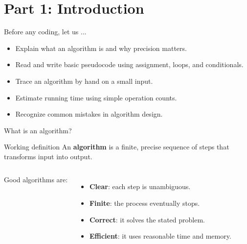 \documentclass[aspectratio=43,10pt]{beamer}
\begin{document}
\section{Part 1: Introduction}

\begin{frame}{Before any coding, let us ...}
  \begin{itemize}
    \item Explain what an algorithm is and why precision matters.
    \item Read and write basic pseudocode using assignment, loops, and conditionals.
    \item Trace an algorithm by hand on a small input.
    \item Estimate running time using simple operation counts.
    \item Recognize common mistakes in algorithm design.
  \end{itemize}
\end{frame}


\begin{frame}{What is an algorithm?}
  \begin{block}{Working definition}
    An \textbf{algorithm} is a finite, precise sequence of steps that transforms input into output.
  \end{block}

  \vspace{0.5em}
  \begin{columns}[T]
      Good algorithms are:
      \begin{itemize}
        \item \textbf{Clear}: each step is unambiguous.
        \item \textbf{Finite}: the process eventually stops.
        \item \textbf{Correct}: it solves the stated problem.
        \item \textbf{Efficient}: it uses reasonable time and memory.
      \end{itemize}
  \end{columns}
\end{frame}
\end{document}
